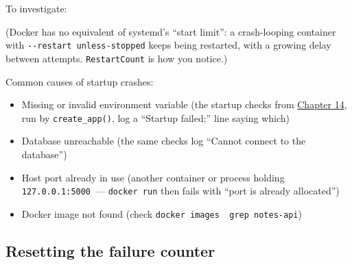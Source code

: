 \noindent{}To investigate:

\begin{codebox}[short]

\begin{Shaded}
\begin{Highlighting}[]
 
\OperatorTok{=}

 
\end{Highlighting}
\end{Shaded}

\end{codebox}

\noindent{}(Docker has no equivalent of systemd's ``start limit'': a crash-looping container with \texttt{-}\allowbreak{}\texttt{-}\allowbreak{}\texttt{restart\ unless-}\allowbreak{}\texttt{stopped} keeps being restarted, with a growing delay between attempts. \texttt{RestartCount} is how you notice.)

Common causes of startup crashes:

\begin{itemize}
\tightlist
\item
  Missing or invalid environment variable (the startup checks from \hyperref[ch:14-runtime-contract]{Chapter 14}, run by \texttt{create\_app()}, log a ``Startup failed:'' line saying which)
\item
  Database unreachable (the same checks log ``Cannot connect to the database'')
\item
  Host port already in use (another container or process holding \texttt{127.0.0.1:5000}~--- \texttt{docker\ run} then fails with ``port is already allocated'')
\item
  Docker image not found (check \texttt{docker\ images\ \textbar{}\ grep\ notes-}\allowbreak{}\texttt{api})
\end{itemize}

\subsection*{Resetting the failure counter}\label{25-process-management:resetting-the-failure-counter}

